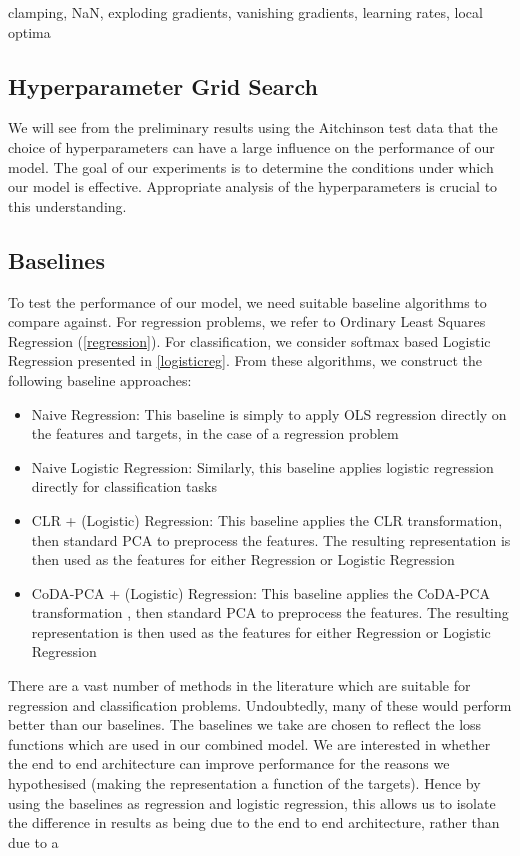 clamping, NaN, exploding gradients, vanishing gradients, learning rates, local optima 


\subsection{Hyperparameter Grid Search}
We will see from the preliminary results using the Aitchinson test data that the choice of hyperparameters can have a large influence on the performance of our model. The goal of our experiments is to determine the conditions under which our model is effective. Appropriate analysis of the hyperparameters is crucial to this understanding. 


\subsection{Baselines}
To test the performance of our model, we need suitable baseline algorithms to compare against. For regression problems, we refer to Ordinary Least Squares Regression (\ref{regression}). For classification, we consider softmax based Logistic Regression presented in \ref{logisticreg}. From these algorithms, we construct the following baseline approaches:

\begin{itemize}
    \item Naive Regression: This baseline is simply to apply OLS regression directly on the features and targets, in the case of a regression problem 
    \item Naive Logistic Regression: Similarly, this baseline applies logistic regression directly for classification tasks
    \item CLR + (Logistic) Regression: This baseline applies the CLR transformation, then standard PCA to preprocess the features. The resulting representation is then used as the features for either Regression or Logistic Regression
    \item CoDA-PCA + (Logistic) Regression: This baseline applies the CoDA-PCA transformation \citep{Avalos2018}, then standard PCA to preprocess the features. The resulting representation is then used as the features for either Regression or Logistic Regression
\end{itemize}


There are a vast number of methods in the literature which are suitable for regression and classification problems. 
Undoubtedly, many of these would perform better than our baselines. The baselines we take are chosen to reflect the loss functions which are used in our combined model. We are interested in whether the end to end architecture can improve performance for the reasons we hypothesised (making the representation a function of the targets). Hence by using the baselines as regression and logistic regression, this allows us to isolate the difference in results as being due to the end to end architecture, rather than due to a \\


